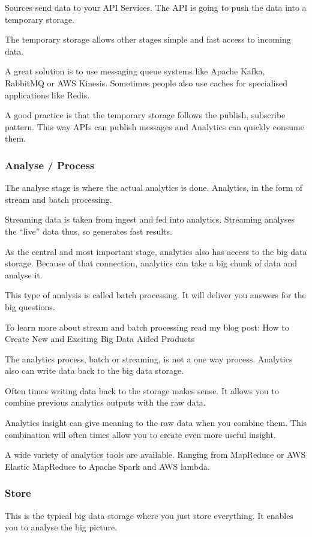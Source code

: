 \documentclass[12pt]{scrartcl} %
\begin{document}
Sources send data to your API Services. The API is going to push the data into a temporary storage.

The temporary storage allows other stages simple and fast access to incoming data.

A great solution is to use messaging queue systems like Apache Kafka, RabbitMQ or AWS Kinesis. Sometimes people also use caches for specialised applications like Redis.

A good practice is that the temporary storage follows the publish, subscribe pattern. This way APIs can publish messages and Analytics can quickly consume them.

\subsubsection{Analyse / Process}
The analyse stage is where the actual analytics is done. Analytics, in the form of stream and batch processing.

Streaming data is taken from ingest and fed into analytics. Streaming analyses the “live” data thus, so generates fast results.

As the central and most important stage, analytics also has access to the big data storage. Because of that connection, analytics can take a big chunk of data and analyse it.

This type of analysis is called batch processing. It will deliver you answers for the big questions.

To learn more about stream and batch processing read my blog post: How to Create New and Exciting Big Data Aided Products

The analytics process, batch or streaming, is not a one way process. Analytics also can write data back to the big data storage.

Often times writing data back to the storage makes sense. It allows you to combine previous analytics outputs with the raw data.

Analytics insight can give meaning to the raw data when you combine them. This combination will often times allow you to create even more useful insight.

A wide variety of analytics tools are available. Ranging from MapReduce or AWS Elastic MapReduce to Apache Spark and AWS lambda.

\subsubsection{Store}
This is the typical big data storage where you just store everything. It enables you to analyse the big picture.
\end{document}

